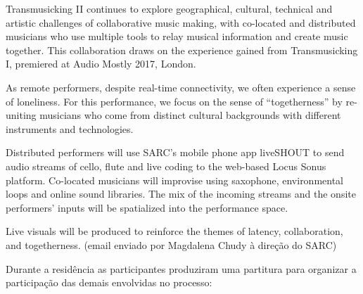 \begin{citacao}
Transmusicking II continues to explore geographical, cultural, technical and artistic challenges of collaborative music making, with co-located and distributed musicians who use multiple tools to relay musical information and create music together. This collaboration draws on the experience gained from Transmusicking I, premiered at Audio Mostly 2017, London.

As remote performers, despite real-time connectivity, we often experience a sense of loneliness. For this performance, we focus on the sense of “togetherness” by re-uniting musicians who come from distinct cultural backgrounds with different instruments and technologies. 

Distributed performers will use SARC’s mobile phone app liveSHOUT to send audio streams of cello, flute and live coding to the web-based Locus Sonus platform. Co-located musicians will improvise using saxophone, environmental loops and online sound libraries. 
The mix of the incoming streams and the onsite performers’ inputs will be spatialized into the performance space.

Live visuals will be produced to reinforce the themes of latency, collaboration, and togetherness. (email enviado por Magdalena Chudy à direção do SARC)
\end{citacao}

Durante a residência as participantes produziram uma partitura para organizar a participação das demais envolvidas no processo:

